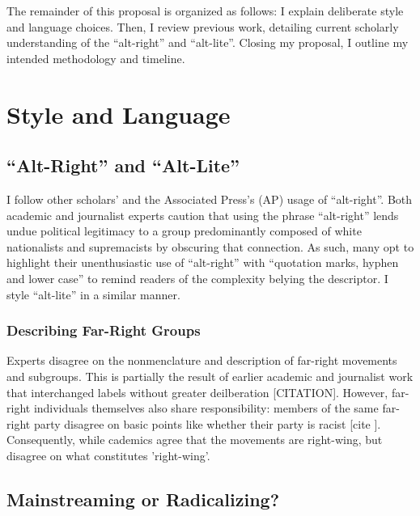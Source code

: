\documentclass[acmlarge, screen, authorversion]{acmart}
\begin{document}
\medskip

The remainder of this proposal is organized as follows: I explain deliberate style and language
choices. Then, I review previous work, detailing current scholarly understanding of the “alt-right”
and “alt-lite”. Closing my proposal, I outline my intended methodology and timeline.

\section{Style and Language}

\subsection{“Alt-Right” and “Alt-Lite”}

I follow other scholars’ \cite{hartzellAltWhiteConceptualizingAltRight, massanariRethinkingResearchEthics2018} and the
Associated Press’s (AP) \cite{johndaniszewskiWritingAltright2016} usage of “alt-right”.
Both academic and journalist experts caution that using the
phrase “alt-right” lends undue political legitimacy to a group predominantly
composed of white nationalists and supremacists by obscuring that
connection. As such, many opt to highlight their unenthusiastic use of
“alt-right” with “quotation marks, hyphen and lower case”
\cite{johndaniszewskiWritingAltright2016} to remind readers of the complexity belying the
descriptor. I style “alt-lite” in a similar manner.

\subsubsection{Describing Far-Right Groups}

Experts disagree on the nonmenclature and description of far-right movements and
subgroups. This is partially the result of earlier academic and journalist work
that interchanged labels without greater deilberation [CITATION]. However,
far-right individuals themselves also share responsibility: members of the same
far-right party disagree on basic points like whether their party is racist
[cite ]. Consequently, while cademics agree that the movements are right-wing,
but disagree on what constitutes 'right-wing'.

\subsection{Mainstreaming or Radicalizing?}
\end{document}
